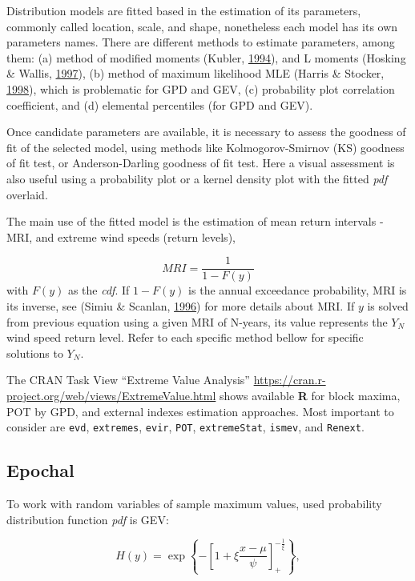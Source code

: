 \documentclass[12pt,oneside]{reedthesis}
\begin{document}
Distribution models are fitted based in the estimation of its parameters, commonly called location, scale, and shape, nonetheless each model has its own parameters names. There are different methods to estimate parameters, among them: (a) method of modified moments (Kubler, \protect\hyperlink{ref-Kubler1994}{1994}), and L moments (Hosking \& Wallis, \protect\hyperlink{ref-Hosking1997}{1997}), (b) method of maximum likelihood MLE (Harris \& Stocker, \protect\hyperlink{ref-Harris1994}{1998}), which is problematic for GPD and GEV, (c) probability plot correlation coefficient, and (d) elemental percentiles (for GPD and GEV).

Once candidate parameters are available, it is necessary to assess the goodness of fit of the selected model, using methods like Kolmogorov-Smirnov (KS) goodness of fit test, or Anderson-Darling goodness of fit test. Here a visual assessment is also useful using a probability plot or a kernel density plot with the fitted \emph{pdf} overlaid.

The main use of the fitted model is the estimation of mean return intervals - MRI, and extreme wind speeds (return levels),

\[
MRI=\frac{1}{1-F(y)}
\]
with \(F(y)\) as the \emph{cdf}. If \(1-F(y)\) is the annual exceedance probability, MRI is its inverse, see (Simiu \& Scanlan, \protect\hyperlink{ref-Simiu1996}{1996}) for more details about MRI. If \(y\) is solved from previous equation using a given MRI of N-years, its value represents the \(Y_N\) wind speed return level. Refer to each specific method bellow for specific solutions to \(Y_N\).

The CRAN Task View ``Extreme Value Analysis'' \url{https://cran.r-project.org/web/views/ExtremeValue.html} shows available \textbf{R} for block maxima, POT by GPD, and external indexes estimation approaches. Most important to consider are \texttt{evd}, \texttt{extremes}, \texttt{evir}, \texttt{POT}, \texttt{extremeStat}, \texttt{ismev}, and \texttt{Renext}.

\hypertarget{epochal}{%
\subsection{Epochal}\label{epochal}}

To work with random variables of sample maximum values, used probability distribution function \emph{pdf} is GEV:

\[
H(y) = \exp\left\{-\left[1+\xi\frac{x-\mu}{\psi}\right]_+^{-\frac{1}{\xi}}\right\},
\]
\end{document}
